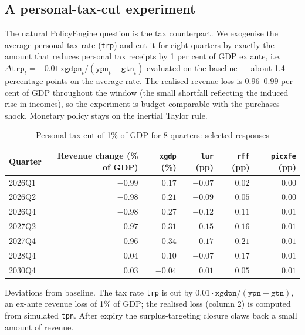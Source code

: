 \subsection{A personal-tax-cut experiment}
\label{sec:taxcut}

The natural PolicyEngine question is the tax counterpart. We exogenise the average personal tax rate (\texttt{trp}) and cut it for eight quarters by exactly the amount that reduces personal tax receipts by 1 per cent of GDP ex ante, i.e.\ $\Delta \texttt{trp}_t = -0.01\,\texttt{xgdpn}_t/(\texttt{ypn}_t-\texttt{gtn}_t)$ evaluated on the baseline --- about 1.4 percentage points on the average rate. The realised revenue loss is 0.96--0.99 per cent of GDP throughout the window (the small shortfall reflecting the induced rise in incomes), so the experiment is budget-comparable with the purchases shock. Monetary policy stays on the inertial Taylor rule.

\begin{table}[htbp]
\centering
\caption{Personal tax cut of 1\% of GDP for 8 quarters: selected responses}
\label{tab:taxcut}
\small
\begin{tabular}{lrrrrr}
\toprule
Quarter & Revenue change (\% of GDP) & \texttt{xgdp} (\%) & \texttt{lur} (pp) & \texttt{rff} (pp) & \texttt{picxfe} (pp) \\
\midrule
2026Q1 & $-0.99$ & $0.17$ & $-0.07$ & $0.02$ & $0.00$ \\
2026Q2 & $-0.98$ & $0.21$ & $-0.09$ & $0.05$ & $0.00$ \\
2026Q4 & $-0.98$ & $0.27$ & $-0.12$ & $0.11$ & $0.01$ \\
2027Q2 & $-0.97$ & $0.31$ & $-0.15$ & $0.16$ & $0.01$ \\
2027Q4 & $-0.96$ & $\mathbf{0.34}$ & $-0.17$ & $0.21$ & $0.01$ \\
2028Q4 & $0.04$  & $0.10$ & $-0.07$ & $0.17$ & $0.01$ \\
2030Q4 & $0.03$  & $-0.04$ & $0.01$ & $0.05$ & $0.01$ \\
\bottomrule
\end{tabular}

\medskip
\parbox{0.95\textwidth}{\footnotesize Deviations from baseline. The tax rate \texttt{trp} is cut by $0.01\cdot\texttt{xgdpn}/(\texttt{ypn}-\texttt{gtn})$, an ex-ante revenue loss of 1\% of GDP; the realised loss (column 2) is computed from simulated \texttt{tpn}. After expiry the surplus-targeting closure claws back a small amount of revenue.}
\end{table}

